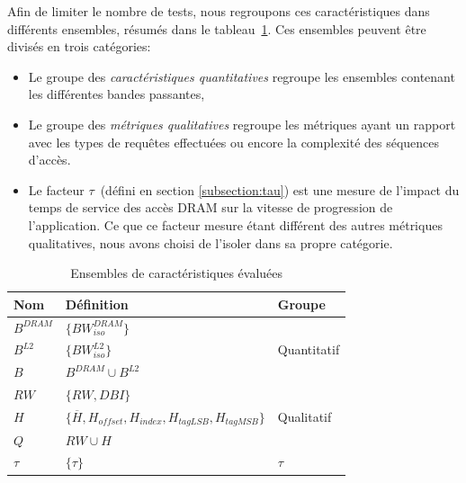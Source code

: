 Afin de limiter le nombre de tests, nous regroupons ces caractéristiques dans différents ensembles, résumés dans le tableau~\ref{table:feature-sets}.
Ces ensembles peuvent être divisés en trois catégories:
\begin{itemize}
	\item Le groupe des \emph{caractéristiques quantitatives} regroupe les ensembles contenant les différentes bandes passantes,
	\item Le groupe des \emph{métriques qualitatives} regroupe les métriques ayant un rapport avec les types de requêtes effectuées ou encore la complexité des séquences d'accès.
	\item Le facteur $\tau$~(défini en section \ref{subsection:tau}) est une mesure de l'impact du temps de service des accès DRAM sur la vitesse de progression de l'application.
	Ce que ce facteur mesure étant différent des autres métriques qualitatives, nous avons choisi de l'isoler dans sa propre catégorie.

\end{itemize}

\begin{table}
	\centering
	\setlength{\tabcolsep}{22pt}
	\begin{tabular}{l l l}
		\toprule
		\textbf{Nom} & \textbf{Définition} & \textbf{Groupe} \\
		\midrule
	 		$B^{DRAM}$ & $\{BW_{iso}^{DRAM}\}$ & \multirow{3}{*}{Quantitatif}\\
	 		$B^{L2}$ & $\{BW_{iso}^{L2}\}$ & \\
	 		$B$ & $B^{DRAM} \cup B^{L2}$ & \\
		\midrule
		$RW$ & $\{RW, DBI\}$ & \multirow{3}{*}{Qualitatif} \\
		$H$  & $\{\overline{H},H_{offset},H_{index},H_{tagLSB},H_{tagMSB}\}$ & \\
		$Q$ & $RW \cup H$ \\
		\midrule
		$\tau$ & $\{\tau\}$  & $\tau$ \\
		\bottomrule
	\end{tabular}
	\caption{\label{table:feature-sets}Ensembles de caractéristiques évaluées}
\end{table}

